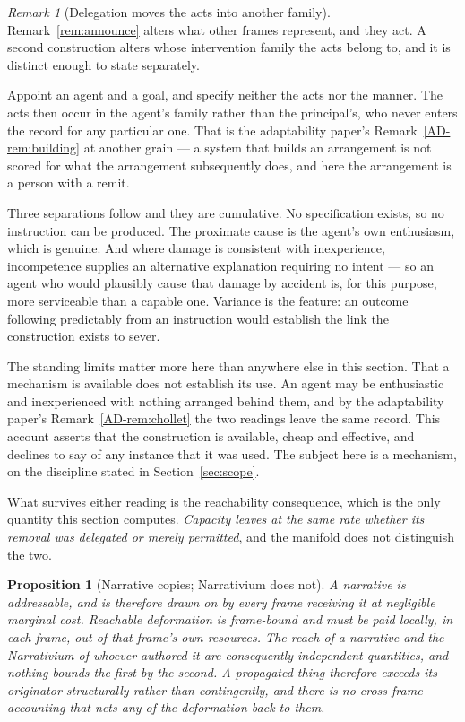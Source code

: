 \documentclass[11pt,a4paper]{article}
\newtheorem{proposition}[definition]{Proposition}
\theoremstyle{remark}
\newtheorem{remark}[definition]{Remark}
\begin{document}
\begin{remark}[Delegation moves the acts into another family]\label{rem:delegate}
Remark~\ref{rem:announce} alters what other frames represent, and they act. A second construction
alters whose intervention family the acts belong to, and it is distinct enough to state separately.

Appoint an agent and a goal, and specify neither the acts nor the manner. The acts then occur in
the agent's family rather than the principal's, who never enters the record for any particular one. That
is the adaptability paper's Remark~\ref{AD-rem:building} at another grain --- a system that builds an arrangement is not scored for
what the arrangement subsequently does, and here the arrangement is a person with a remit.

Three separations follow and they are cumulative. No specification exists, so no instruction can
be produced. The proximate cause is the agent's own enthusiasm, which is genuine. And where damage is
consistent with inexperience, incompetence supplies an alternative explanation requiring no
intent --- so an agent who would plausibly cause that damage by accident is, for this purpose, more
serviceable than a capable one. Variance is the feature: an outcome following predictably from an
instruction would establish the link the construction exists to sever.

The standing limits matter more here than anywhere else in this section. That a mechanism is
available does not establish its use. An agent may be enthusiastic and inexperienced with nothing
arranged behind them, and by the adaptability paper's Remark~\ref{AD-rem:chollet} the two readings leave the same record.
This account asserts that the construction is available, cheap and effective, and declines to say
of any instance that it was used. The subject here is a mechanism, on the discipline stated in
Section~\ref{sec:scope}.

What survives either reading is the reachability consequence, which is the only quantity this
section computes. \emph{Capacity leaves at the same rate whether its removal was delegated or merely
permitted}, and the manifold does not distinguish the two.
\end{remark}

\begin{proposition}[Narrative copies; Narrativium does not]\label{prop:narrative-copies}
A narrative is addressable, and is therefore drawn on by every frame receiving it at negligible marginal
cost. Reachable deformation is frame-bound and must be paid locally, in each frame, out of that frame's
own resources. The reach of a narrative and the Narrativium of whoever authored it are consequently
independent quantities, and nothing bounds the first by the second. A propagated thing therefore exceeds
its originator structurally rather than contingently, and there is no cross-frame accounting that nets
any of the deformation back to them.
\end{proposition}
\end{document}
